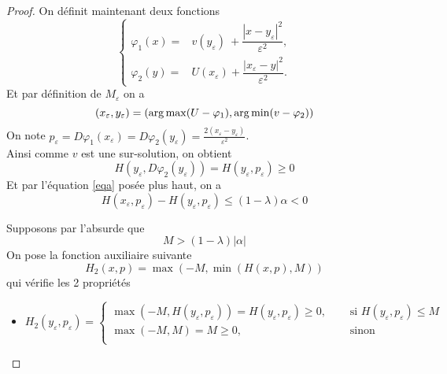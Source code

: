 \begin{proof}
On définit maintenant deux fonctions 
\begin{equation*}
    \begin{cases}
    \varphi_1(x)=&v(y_\varepsilon)\ +\dfrac{|x-y_\varepsilon|^2}{\varepsilon^2},\\
    \varphi_2(y)=&U(x_\varepsilon)+\dfrac{|x_\varepsilon-y|^2}{\varepsilon^2}.
    \end{cases}
\end{equation*}
Et par définition de $M_\varepsilon$ on a
\begin{equation*}
    (x_\varepsilon,y_\varepsilon)=(\operatorname*{arg\,max}(U-\varphi_1),\operatorname*{arg\,min}(v-\varphi_2))
\end{equation*}
On note $p_\varepsilon =D\varphi_1(x_\varepsilon)=D\varphi_2(y_\varepsilon)=\frac{2(x_\varepsilon-y_\varepsilon)}{\varepsilon^2}$.\\
Ainsi comme $v$ est une sur-solution, on obtient 
\begin{equation*}
    H(y_\varepsilon,D\varphi_2(y_\varepsilon))=H(y_\varepsilon,p_\varepsilon)\ge 0
\end{equation*}
Et par l'équation \eqref{eqa} posée plus haut, on a
\begin{equation*}
    H(x_\varepsilon,p_\varepsilon)-H(y_\varepsilon,p_\varepsilon)\le (1-\lambda)\alpha<0
\end{equation*}

Supposons par l'absurde que 
\begin{equation*}
    M> (1-\lambda)|\alpha|
\end{equation*}
On pose la fonction auxiliaire suivante 
\begin{equation*}
    H_2(x,p)=\max(-M,\min(H(x,p),M))
\end{equation*}
qui vérifie les 2 propriétés
\begin{itemize}
    \item 
    $H_2(y_\varepsilon,p_\varepsilon)=
    \begin{cases}
        \max(-M,H(y_\varepsilon,p_\varepsilon))=H(y_\varepsilon,p_\varepsilon)\ge 0, \quad&\text{ si $H(y_\varepsilon,p_\varepsilon)\le M$}\\
        \max(-M,M)=M\ge 0, \quad &\text{ sinon}\\
    \end{cases}$\\


\end{itemize}
\end{proof}
